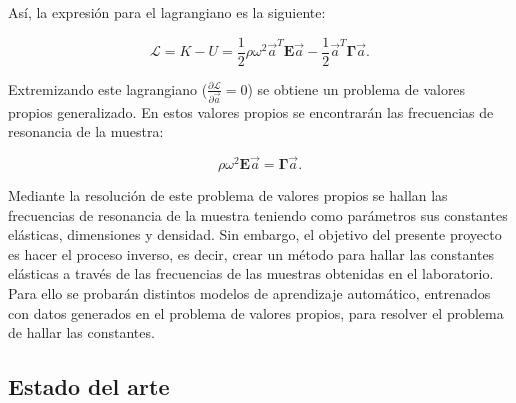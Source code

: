 \documentclass[12pt]{article}
\begin{document}
Así, la expresión para el lagrangiano es la siguiente: 

\begin{equation}
	\mathcal{L} = K - U = \frac{1}{2} \rho \omega^2 \vec{a}^{T}\bm{E}\vec{a} - \frac{1}{2} \vec{a}^{T}\bm{\Gamma}\vec{a}.
\end{equation}

Extremizando este lagrangiano ($\frac{\partial \mathcal{L}}{\partial \vec{a}} = 0$) se obtiene un problema de valores propios generalizado. En estos valores propios se encontrarán las frecuencias de resonancia de la muestra:

\begin{equation}
	\rho \omega^2 \bm{E} \vec{a} = \bm{\Gamma} \vec{a}.
	\label{eq:eigenvalue-problem}
\end{equation}

Mediante la resolución de este problema de valores propios se hallan las frecuencias de resonancia de la muestra teniendo como parámetros sus constantes elásticas, dimensiones y densidad. Sin embargo, el objetivo del presente proyecto es hacer el proceso inverso, es decir, crear un método para hallar las constantes elásticas a través de las frecuencias de las muestras obtenidas en el laboratorio. Para ello se probarán distintos modelos de aprendizaje automático, entrenados con datos generados en el problema de valores propios, para resolver el problema de hallar las constantes. 

\subsection{Estado del arte}
\end{document}
